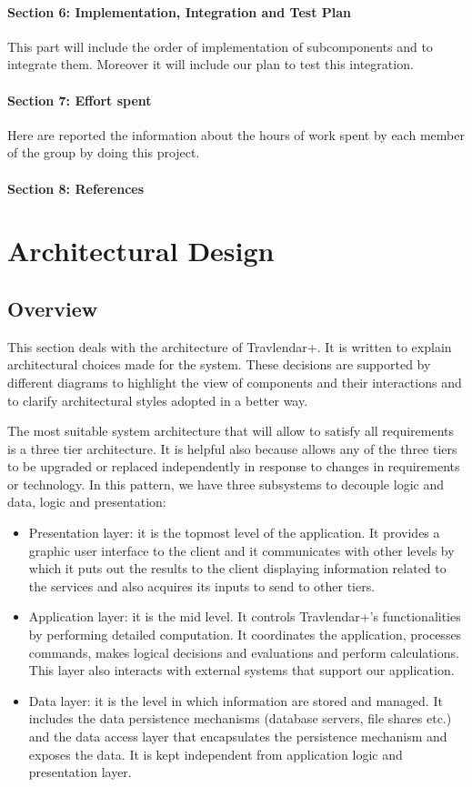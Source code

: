 \documentclass[12pt,titlepage]{article}
\begin{document}
\paragraph{Section 6: Implementation, Integration and Test Plan}
This part will include the order of implementation of subcomponents and to integrate them. Moreover it will include our plan to test this integration.
\paragraph{Section 7: Effort spent}
Here are reported the information about the hours of work spent by each member of the group by doing this project.
\paragraph{Section 8: References}

\section{Architectural Design}
\subsection{Overview}
This section deals with the architecture of Travlendar+. It is written to explain architectural choices made for the system. These decisions are supported by different diagrams to highlight the view of components and their interactions and to clarify architectural styles adopted in a better way.

The most suitable system architecture that will allow to satisfy all requirements is a three tier architecture. It is helpful also because allows any of the three tiers to be upgraded or replaced independently in response to changes in requirements or technology.
In this pattern, we have three subsystems to decouple logic and data, logic and presentation: 
\begin{itemize}
\item Presentation layer: it is the topmost level of the application. It provides a graphic user interface to the client and it communicates with other levels by which it puts out the results to the client displaying information  related to the services and also acquires its inputs to send to other tiers.
\item Application layer:  it is the mid level. It controls Travlendar+'s functionalities by performing detailed computation. It coordinates the application, processes commands, makes logical decisions and evaluations and perform calculations. This layer also interacts with external systems that support our application.
\item Data layer: it is the level in which information are stored and managed. It includes the data persistence mechanisms (database servers, file shares etc.) and the data access layer that encapsulates the persistence mechanism and exposes the data. It is kept independent from application logic and presentation layer.
\end{itemize}
\end{document}
